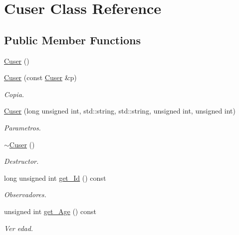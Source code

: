 \hypertarget{class_cuser}{}\section{Cuser Class Reference}
\label{class_cuser}
\subsection*{Public Member Functions}
\begin{DoxyCompactItemize}
\item 
\hyperlink{class_cuser_a28d26161b1076a72f30e41d52132e636}{Cuser} ()
\item 
\hyperlink{class_cuser_a6c2305c658e82cd50ec20778069b1539}{Cuser} (const \hyperlink{class_cuser}{Cuser} \&p)
\begin{DoxyCompactList}\small\item\em Copia. \end{DoxyCompactList}\item 
\hyperlink{class_cuser_ab027c481fee361a5c982c2a3f1a3c266}{Cuser} (long unsigned int, std\+::string, std\+::string, unsigned int, unsigned int)
\begin{DoxyCompactList}\small\item\em Parametros. \end{DoxyCompactList}\item 
\mbox{\label{class_cuser_a42e6967197e231f8a62d5d2c86451ca4}} 
\hyperlink{class_cuser_a42e6967197e231f8a62d5d2c86451ca4}{$\sim$\+Cuser} ()
\begin{DoxyCompactList}\small\item\em Destructor. \end{DoxyCompactList}\item 
long unsigned int \hyperlink{class_cuser_a165c1134c4e711e74c8a8cc9e286f472}{get\+\_\+\+Id} () const
\begin{DoxyCompactList}\small\item\em Observadores. \end{DoxyCompactList}\item 
\mbox{\label{class_cuser_a6ee788451362449cb1195f7b0d59557d}} 
unsigned int \hyperlink{class_cuser_a6ee788451362449cb1195f7b0d59557d}{get\+\_\+\+Age} () const
\begin{DoxyCompactList}\small\item\em Ver edad. \end{DoxyCompactList}\item 

\end{DoxyCompactItemize}
